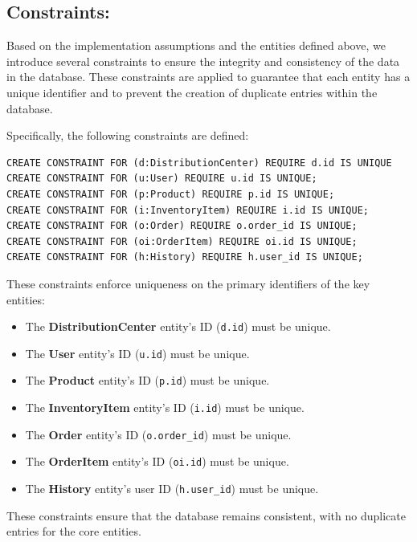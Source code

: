\documentclass[a4paper,12pt]{article}
\begin{document}
\subsection{Constraints:}
\par Based on the implementation assumptions and the entities defined above, we introduce several constraints to ensure the integrity and consistency of the data in the database. These constraints are applied to guarantee that each entity has a unique identifier and to prevent the creation of duplicate entries within the database.

\par Specifically, the following constraints are defined:

\begin{verbatim}
CREATE CONSTRAINT FOR (d:DistributionCenter) REQUIRE d.id IS UNIQUE 
CREATE CONSTRAINT FOR (u:User) REQUIRE u.id IS UNIQUE;
CREATE CONSTRAINT FOR (p:Product) REQUIRE p.id IS UNIQUE;
CREATE CONSTRAINT FOR (i:InventoryItem) REQUIRE i.id IS UNIQUE;
CREATE CONSTRAINT FOR (o:Order) REQUIRE o.order_id IS UNIQUE;
CREATE CONSTRAINT FOR (oi:OrderItem) REQUIRE oi.id IS UNIQUE;
CREATE CONSTRAINT FOR (h:History) REQUIRE h.user_id IS UNIQUE;
\end{verbatim}

\par These constraints enforce uniqueness on the primary identifiers of the key entities:
\begin{itemize}[noitemsep]
    \item The \textbf{DistributionCenter} entity's ID (\texttt{d.id}) must be unique.
    \item The \textbf{User} entity's ID (\texttt{u.id}) must be unique.
    \item The \textbf{Product} entity's ID (\texttt{p.id}) must be unique.
    \item The \textbf{InventoryItem} entity's ID (\texttt{i.id}) must be unique.
    \item The \textbf{Order} entity's ID (\texttt{o.order\_id}) must be unique.
    \item The \textbf{OrderItem} entity's ID (\texttt{oi.id}) must be unique.
    \item The \textbf{History} entity's user ID (\texttt{h.user\_id}) must be unique.
\end{itemize}

\par These constraints ensure that the database remains consistent, with no duplicate entries for the core entities.
\end{document}
